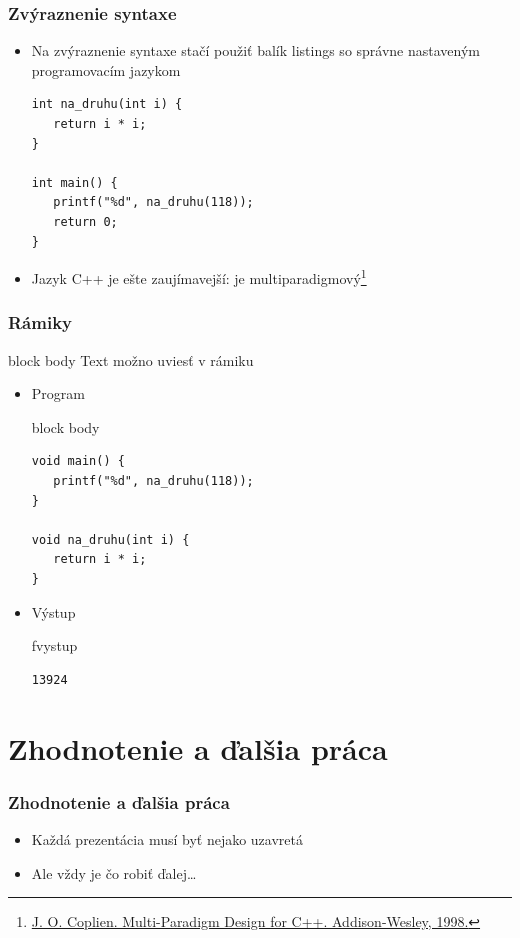 \documentclass{beamer}
\newcommand{\footcite}[1]{\footnote{\tiny #1}}
\newenvironment{program}{\begin{beamercolorbox}[rounded=true,shadow=true]{block body}\vspace{-4mm}}{\vspace{-2mm}\end{beamercolorbox}}
\newenvironment{vystup}{\begin{beamercolorbox}[rounded=true,shadow=true]{fvystup}}{\end{beamercolorbox}}
\newenvironment{poznamka}{\begin{beamercolorbox}[rounded=true,shadow=false]{block body}}{\end{beamercolorbox}}
\begin{document}
\begin{frame}[fragile=singleslide]\frametitle{Zvýraznenie syntaxe}
	\begin{itemize}
		\item Na zvýraznenie syntaxe stačí použiť balík listings so správne nastaveným programovacím jazykom
		      \begin{lstlisting}
int na_druhu(int i) {
   return i * i;
}

int main() {
   printf("%d", na_druhu(118));
   return 0;
}
\end{lstlisting}

		\item Jazyk C++ je ešte zaujímavejší: je multiparadigmový\footcite{\url{J. O. Coplien. Multi-Paradigm Design for C++. Addison-Wesley, 1998.}}
	\end{itemize}
\end{frame}


\begin{frame}[fragile=singleslide]\frametitle{Rámiky}
	\begin{poznamka}
		Text možno uviesť v rámiku
	\end{poznamka}

	\begin{itemize}
		\item Program

		      \begin{program}
			      \begin{lstlisting}
void main() {
   printf("%d", na_druhu(118));
}

void na_druhu(int i) {
   return i * i;
}
\end{lstlisting}
		      \end{program}

		\item Výstup
		      \begin{vystup}
			      \begin{lstlisting}
13924
\end{lstlisting}
		      \end{vystup}

	\end{itemize}
\end{frame}



\section*{Zhodnotenie a ďalšia práca}

\begin{frame}[fragile=singleslide]\frametitle{Zhodnotenie a ďalšia práca}
	\begin{itemize}
		\item Každá prezentácia musí byť nejako uzavretá
		\item Ale vždy je čo robiť ďalej\ldots{}
	\end{itemize}
\end{frame}
\end{document}
